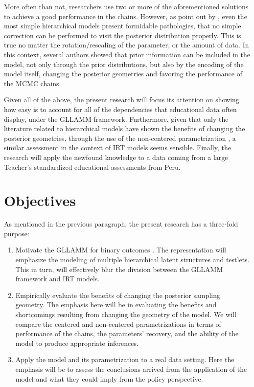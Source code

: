 More often than not, researchers use two or more of the aforementioned solutions to achieve a good performance in the chains. However, as point out by \citet{Betancourt_et_al_2013}, even the most simple hierarchical models present formidable pathologies, that no simple correction can be performed to visit the posterior distribution properly. This is true no matter the rotation/rescaling of the parameter, or the amount of data. In this context, several authors \cite{Gelfand_et_al_1995, Gelfand_et_al_1996, Papaspiliopoulos_et_al_2003, Papaspiliopoulos_et_al_2007, Betancourt_et_al_2013} showed that prior information can be included in the model, not only through the prior distributions, but also by the encoding of the model itself, changing the posterior geometries and favoring the performance of the MCMC chains.

Given all of the above, the present research will focus its attention on showing how easy is to account for all of the dependencies that educational data often display, under the GLLAMM framework. Furthermore, given that only the literature related to hierarchical models have shown the benefits of changing the posterior geometries, through the use of the non-centered parametrization \cite{Gelfand_et_al_1995, Gelfand_et_al_1996, Papaspiliopoulos_et_al_2003, Papaspiliopoulos_et_al_2007, Betancourt_et_al_2013}, a similar assessment in the context of IRT models seems sensible. Finally, the research will apply the newfound knowledge to a data coming from a large Teacher's standardized educational assessments from Peru.




\section{Objectives}

As mentioned in the previous paragraph, the present research has a three-fold purpose:

\begin{enumerate}
	\item Motivate the GLLAMM for binary outcomes \cite{Rabe_et_al_2004a, Rabe_et_al_2004b, Skrondal_et_al_2004a, Rabe_et_al_2012}. The representation will emphasize the modeling of multiple hierarchical latent structures and testlets. This in turn, will effectively blur the division between the GLLAMM framework and IRT models.
	
	\item Empirically evaluate the benefits of changing the posterior sampling geometry. The emphasis here will be in evaluating the benefits and shortcomings resulting from changing the geometry of the model. We will compare the centered and non-centered parametrizations \cite{Gelfand_et_al_1995, Gelfand_et_al_1996} in terms of performance of the chains, the parameters' recovery, and the ability of the model to produce appropriate inferences.
	
	\item Apply the model and its parametrization to a real data setting. Here the emphasis will be to assess the conclusions arrived from the application of the model and what they could imply from the policy perspective.
\end{enumerate}

